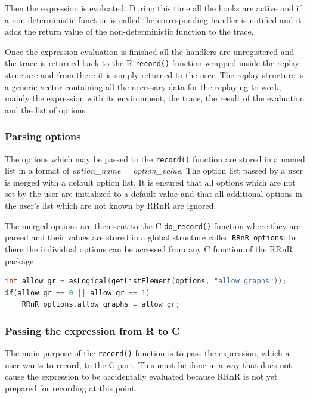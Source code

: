\documentclass[thesis=M,english,hidelinks]{FITthesis}[2012/10/20]
\begin{document}
			Then the expression is evaluated. During this time all the hooks are active and if a non-deterministic function is called the corresponding handler is notified and it adds the return value of the non-deterministic function to the trace.\par
			
			Once the expression evaluation is finished all the handlers are unregistered and the trace is returned back to the R \lstinline|record()| function wrapped inside the replay structure and from there it is simply returned to the user. The replay structure is a generic vector containing all the necessary data for the replaying to work, mainly the expression with its environment, the trace, the result of the evaluation and the list of options.\par

			\subsubsection{Parsing options}
			The options which may be passed to the \lstinline|record()| function are stored in a named list in a format of \emph{option\_name = option\_value}. The option list passed by a user is merged with a default option list. It is ensured that all options which are not set by the user are initialized to a default value and that all additional options in the user's list which are not known by RRnR are ignored.\par
			
			The merged options are then sent to the C \lstinline|do_record()| function where they are parsed and their values are stored in a global structure called \lstinline|RRnR_|\allowbreak\lstinline|options|. In there the individual options can be accessed from any C function of the RRnR package.\par
			
\begin{lstlisting}[style=filestyle, language=C, caption={Example of option parsing in C}]
int allow_gr = asLogical(getListElement(options, "allow_graphs"));
if(allow_gr == 0 || allow_gr == 1)
	RRnR_options.allow_graphs = allow_gr;
\end{lstlisting}
			
			\subsubsection{Passing the expression from R to C}
			The main purpose of the \lstinline|record()| function is to pass the expression, which a user wants to record, to the C part. This must be done in a way that does not cause the expression to be accidentally evaluated because RRnR is not yet prepared for recording at this point.\par
			
\end{document}
